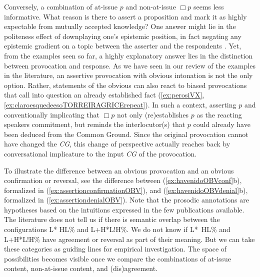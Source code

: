Conversely, a combination of at-issue $p$ and non-at-issue $\Box p$ seems less informative. What reason is there to assert a proposition and mark it as highly expectable from mutually accepted knowledge? One answer might lie in the politeness effect of downplaying one's epistemic position, in fact negating any epistemic gradient on a topic between the asserter and the respondents \citep{Heritage.2012epistemicengine}. Yet, from the examples seen so far, a highly explanatory answer lies in the distinction between provocation and response. As we have seen in our review of the examples in the literature, an assertive provocation with obvious intonation is not the only option. Rather, statements of the obvious can also react to biased provocations that call into question an already established fact (\ref{ex:perosiVX},\ref{ex:claroesquedeesoTORREIRAGRICErepeat}). In such a context, asserting $p$ and conventionally implicating that $\Box p$ not only (re)establishes $p$ as the reacting speakers commitment, but reminds the interlocutor(s) that $p$ could already have been deduced from the Common Ground. Since the original provocation cannot have changed the \textit{CG}, this change of perspective actually reaches back by conversational implicature to the input \textit{CG} of the provocation. 

To illustrate the difference between an obvious provocation and an obvious confirmation or reversal, see the difference between (\ref{ex:havenidoOBVconf}b), formalized in (\ref{ex:assertionconfirmationOBV}), and (\ref{ex:havenidoOBVdenial}b), formalized in (\ref{ex:assertiondenialOBV}). Note that the prosodic annotations are hypotheses based on the intuitions expressed in the few publications available. The literature does not tell us if there is semantic overlap between the configurations L* HL\% and L+H*L!H\%. We do not know if L*~HL\% and L+H*L!H\% have agreement or reversal as part of their meaning. But we can take these categories as guiding lines for empirical investigation. The space of possibilities becomes visible once we compare the combinations of at-issue content, non-at-issue content, and (dis)a\-gree\-ment.

